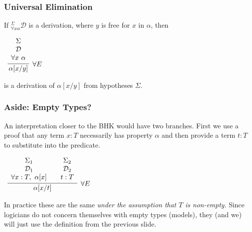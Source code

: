 \documentclass{beamer}
\theoremstyle{indentDefn} \newtheorem{defn}[]{Definition}
\begin{document}
\begin{frame}
	\frametitle{Universal Elimination}
	
	If $^{\Sigma}_{\forall x \alpha}\mathcal{D}$ is a derivation, where $y$ is free for $x$ in $\alpha$, then
	
	\vspace{0.5cm}
	
	\begin{center}
		$\begin{array}{c}
		\infer[\forall E]{\alpha[x/y]}{\begin{array}{c} 
			\Sigma \\
			\mathcal{D} \\ 
			\forall x \ \alpha			
			\end{array}}
		\end{array}$
	\end{center}
	
	is a derivation of $\alpha[x/y]$ from hypotheses $\Sigma$. 
	
\end{frame}

\begin{frame}
	\frametitle{Aside: Empty Types?}

	An interpretation closer to the BHK would have two branches. First we use a proof that any term $x : T$ necessarily has property $\alpha$ and then provide a term $t : T$ to substitute into the predicate.  

	\begin{center}
		$\begin{array}{c}
			\infer[\forall E]{\alpha[x/t]}
				{\begin{array}{c} 
					\Sigma_{1} \\
					\mathcal{D}_{1} \\ 
					\forall x : T, \ \alpha[x]	
					\end{array}
				&
				\begin{array}{c} 
					\Sigma_{2} \\
					\mathcal{D}_{2} \\ 
					t : T			
					\end{array}}
		\end{array}$
	\end{center}

	In practice these are the same \emph{under the assumption that $T$ is non-empty.} Since logicians do not concern themselves with empty types (models), they (and we) will just use the definition from the previous slide. 

\end{frame}
\end{document}

